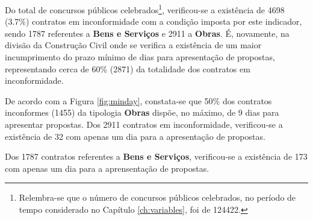 Do total de concursos públicos celebrados\footnote{Relembra-se que o número de concursos públicos celebrados, no período de tempo considerado no Capítulo \ref{ch:variables}, foi de 124422.}, verificou-se a existência de 4698 (3.7\%) contratos em inconformidade com a condição imposta por este indicador, sendo 1787 referentes a \textbf{Bens e Serviços} e 2911 a \textbf{Obras}. É, novamente, na divisão da Construção Civil onde se verifica a existência de um maior incumprimento do prazo mínimo de dias para apresentação de propostas, representando cerca de 60\% (2871) da totalidade dos contratos em inconformidade. 

De acordo com a Figura \ref{fig:minday}, constata-se que 50\% dos contratos inconformes (1455) da tipologia \textbf{Obras} dispõe, no máximo, de 9 dias para apresentar propostas. Dos 2911 contratos em inconformidade, verificou-se a existência de 32 com apenas um dia para a apresentação de propostas. 

Dos 1787 contratos referentes a \textbf{Bens e Serviços},
verificou-se a existência de 173 com apenas um dia para a aprensentação de propostas. 
 

